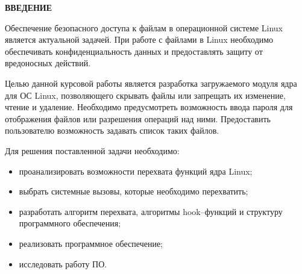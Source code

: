 \begin{center}
    \textbf{ВВЕДЕНИЕ}
\end{center}

Обеспечение безопасного доступа к файлам в операционной системе Linux является актуальной задачей. При работе с файлами в Linux необходимо обеспечивать конфиденциальность данных и предоставлять защиту от вредоносных действий.

Целью данной курсовой работы является разработка загружаемого модуля ядра для ОС Linux, позволяющего скрывать файлы или запрещать их изменение, чтение и удаление. Необходимо предусмотреть возможность ввода пароля для отображения файлов или разрешения операций над ними. Предоставить пользователю возможность задавать список таких файлов.

Для решения поставленной задачи необходимо:
\begin{itemize}
	\item[---] проанализировать возможности перехвата функций ядра Linux;
	\item[---] выбрать системные вызовы, которые необходимо перехватить;
	\item[---] разработать алгоритм перехвата, алгоритмы hook–функций и структуру программного обеспечения;
	\item[---] реализовать программное обеспечение;
	\item[---] исследовать работу ПО.
\end{itemize}

 